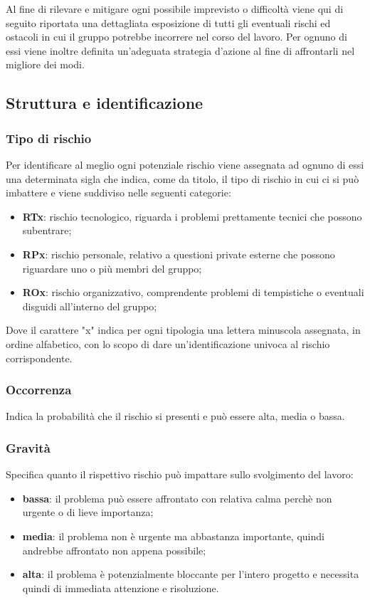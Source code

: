 Al fine di rilevare e mitigare ogni possibile imprevisto o difficoltà viene qui di seguito riportata una dettagliata esposizione di tutti gli eventuali rischi ed ostacoli in cui il gruppo \Gruppo{} potrebbe incorrere nel corso del lavoro. Per ognuno di essi viene inoltre definita un'adeguata strategia d'azione al fine di affrontarli nel migliore dei modi.

\subsection{Struttura e identificazione}
    
    \subsubsection{Tipo di rischio}
    Per identificare al meglio ogni potenziale rischio viene assegnata ad ognuno di essi una determinata sigla che indica, come da titolo, il tipo di rischio in cui ci si può imbattere e viene suddiviso nelle seguenti categorie:
        \begin{itemize}
            \item \textbf{RTx}: rischio tecnologico, riguarda i problemi prettamente tecnici che possono subentrare;
            \item \textbf{RPx}: rischio personale, relativo a questioni private esterne che possono riguardare uno o più membri del gruppo;
            \item \textbf{ROx}: rischio organizzativo, comprendente problemi di tempistiche o eventuali disguidi all'interno del gruppo;
        \end{itemize}
        Dove il carattere "x" indica per ogni tipologia una lettera minuscola assegnata, in ordine alfabetico, con lo scopo di dare un'identificazione univoca al rischio corrispondente.
    
    \subsubsection{Occorrenza}
        Indica la probabilità che il rischio si presenti e può essere alta, media o bassa.

    \subsubsection{Gravità}
        Specifica quanto il rispettivo rischio può impattare sullo svolgimento del lavoro:
        \begin{itemize}
            \item \textbf{bassa}: il problema può essere affrontato con relativa calma perchè non urgente o di lieve importanza;
            \item \textbf{media}: il problema non è urgente ma abbastanza importante, quindi andrebbe affrontato non appena possibile;
            \item \textbf{alta}: il problema è potenzialmente bloccante per l'intero progetto e necessita quindi di immediata attenzione e risoluzione.
        \end{itemize}
    
